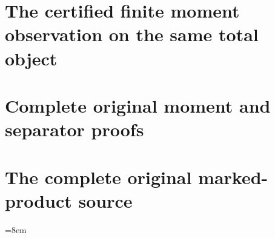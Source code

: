 \documentclass[11pt,a4paper,oneside,openany]{book}
\theoremstyle{definition}
\begin{document}
\chapter{The certified finite moment observation on the same total object}

\chapter{Complete original moment and separator proofs}



\chapter{The complete original marked-product source}

\begingroup\sloppy\emergencystretch=8em

\endgroup
\end{document}
